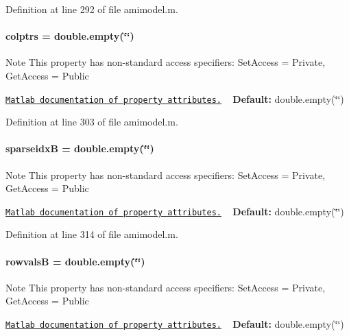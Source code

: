 Definition at line 292 of file amimodel.\+m.

\hypertarget{classamimodel_a887e8a11654afa197d040d8bb10cbb38}{}
\paragraph[{colptrs}]{\setlength{\rightskip}{0pt plus 5cm}colptrs = double.\+empty(\char`\"{}\char`\"{})}\label{classamimodel_a887e8a11654afa197d040d8bb10cbb38}
\begin{DoxyNote}{Note}
This property has non-\/standard access specifiers\+: {\ttfamily Set\+Access = Private, Get\+Access = Public} 

\href{http://www.mathworks.com/help/matlab/matlab_oop/property-attributes.html}{\tt Matlab documentation of property attributes.} ~\newline
{\bfseries Default\+:} double.\+empty(\char`\"{}\char`\"{}) 
\end{DoxyNote}


Definition at line 303 of file amimodel.\+m.

\hypertarget{classamimodel_adcfae93a688a66f1954d0832f51e4cc0}{}
\paragraph[{sparseidx\+B}]{\setlength{\rightskip}{0pt plus 5cm}sparseidx\+B = double.\+empty(\char`\"{}\char`\"{})}\label{classamimodel_adcfae93a688a66f1954d0832f51e4cc0}
\begin{DoxyNote}{Note}
This property has non-\/standard access specifiers\+: {\ttfamily Set\+Access = Private, Get\+Access = Public} 

\href{http://www.mathworks.com/help/matlab/matlab_oop/property-attributes.html}{\tt Matlab documentation of property attributes.} ~\newline
{\bfseries Default\+:} double.\+empty(\char`\"{}\char`\"{}) 
\end{DoxyNote}


Definition at line 314 of file amimodel.\+m.

\hypertarget{classamimodel_a1ba81ee0e28fe7c7576911973c82be70}{}
\paragraph[{rowvals\+B}]{\setlength{\rightskip}{0pt plus 5cm}rowvals\+B = double.\+empty(\char`\"{}\char`\"{})}\label{classamimodel_a1ba81ee0e28fe7c7576911973c82be70}
\begin{DoxyNote}{Note}
This property has non-\/standard access specifiers\+: {\ttfamily Set\+Access = Private, Get\+Access = Public} 

\href{http://www.mathworks.com/help/matlab/matlab_oop/property-attributes.html}{\tt Matlab documentation of property attributes.} ~\newline
{\bfseries Default\+:} double.\+empty(\char`\"{}\char`\"{}) 
\end{DoxyNote}


